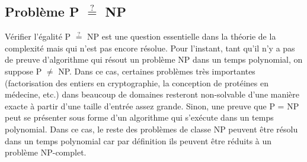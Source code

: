 \documentclass[../main.tex]{subfiles}
\begin{document}
\subsection{Problème P $\stackrel{?}{=}$ NP}
\label{sec:PvNP}
Vérifier l'égalité P $\stackrel{?}{=}$ NP est une question essentielle dans la théorie de la complexité mais qui n'est pas encore résolue. Pour l'instant, tant qu'il n'y a pas de preuve d'algorithme qui résout un problème NP dans un temps polynomial, on suppose P $\neq$ NP. Dans ce cas, certaines problèmes très importantes (factorisation des entiers en cryptographie, la conception de protéines en médecine, etc.) dans beaucoup de domaines resteront non-solvable d'une manière exacte à partir d'une taille d'entrée assez grande. Sinon, une preuve que P = NP peut se présenter sous forme d'un algorithme qui s'exécute dans un temps polynomial. Dans ce cas, le reste des problèmes de classe NP peuvent être résolu dans un temps polynomial car par définition ils peuvent être réduits à un problème NP-complet.
\end{document}
